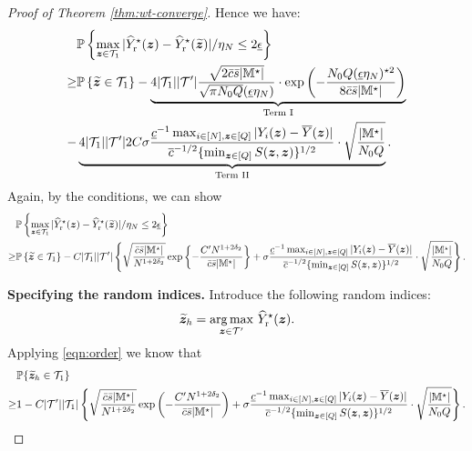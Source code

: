 \documentclass[12pt]{article}
\begin{document}
\begin{proof}[Proof of Theorem \ref{thm:wt-converge}]
Hence we  have:
\begin{align*}
    &{\mathbb{P}}\left\{\max_{{\boldsymbol{z}}\in{\mathcal{T}}_{1}}|{\widehat{Y}}^\star_{\operatorname{r}}({\boldsymbol{z}}) - {\widehat{Y}}^\star_{\operatorname{r}}(\widetilde{{\boldsymbol{z}}})|/\eta_N \le 2\underline{\epsilon}\right\} \\
    \ge & {\mathbb{P}}\left\{\widetilde{{\boldsymbol{z}}}\in {\mathcal{T}}_{1}\right\} -   \underbrace{4|{\mathcal{T}}_{1}| |{\mathcal{T}}'|  \frac{\sqrt{2\bar{c}\bar{s}|{\mathbb{M}}^\star|}}{\sqrt{\pi N_0Q }({\underline{\epsilon}\eta_N})}\cdot \exp\left(-\frac{ N_0Q ({\underline{\epsilon}\eta_N})^{\star 2}}{8\bar{c}\bar{s}|{\mathbb{M}}^\star|}\right)}_{\text{Term I}}\notag\\
    - &  \underbrace{4|{\mathcal{T}}_{1}| |{\mathcal{T}}'| 2C\sigma   \frac{ \underline{c}^{-1} \max_{i\in[N],{\boldsymbol{z}}\in[Q]}|Y_i({\boldsymbol{z}})-\overline{Y}({\boldsymbol{z}})|}{ {\overline{c}^{-1/2} \{\min_{{\boldsymbol{z}}\in[Q]} S({\boldsymbol{z}},{\boldsymbol{z}})}\}^{1/2}}\cdot \sqrt{\frac{|{\mathbb{M}}^\star|}{N_0Q}}}_{\text{Term II}}.
\end{align*}
Again, by the conditions, we can show
\begin{align*}
    &{\mathbb{P}}\left\{\max_{{\boldsymbol{z}}\in{\mathcal{T}}_{1}}|{\widehat{Y}}^\star_{\operatorname{r}}({\boldsymbol{z}}) - {\widehat{Y}}^\star_{\operatorname{r}}(\widetilde{{\boldsymbol{z}}})|/\eta_N \le 2\underline{\epsilon}\right\} \\
    \ge & {\mathbb{P}}\left\{\widetilde{{\boldsymbol{z}}}\in {\mathcal{T}}_{1}\right\} 
    - C|{\mathcal{T}}_{1}| |{\mathcal{T}}'| \left\{\sqrt{\frac{\bar{c}\bar{s}|{\mathbb{M}}^\star|}{N^{1+2\delta_2}}}\exp\left\{-\frac{C'N^{1+2\delta_2}}{\bar{c}\bar{s}|{\mathbb{M}}^\star|}\right\} + \sigma   \frac{ \underline{c}^{-1} \max_{i\in[N],{\boldsymbol{z}}\in[Q]}|Y_i({\boldsymbol{z}})-\overline{Y}({\boldsymbol{z}})|}{ {\overline{c}^{-1/2} \{\min_{{\boldsymbol{z}}\in[Q]} S({\boldsymbol{z}},{\boldsymbol{z}})}\}^{1/2}}\cdot \sqrt{\frac{|{\mathbb{M}}^\star|}{N_0Q}}\right\}.
\end{align*}

\textbf{Specifying the random indices.}
    Introduce the following random indices:
    \begin{align*}
        \widetilde{{\boldsymbol{z}}}_h = \underset{{\boldsymbol{z}}\in{\mathcal{T}}'}{\arg\max}~{\widehat{Y}}^\star_{\operatorname{r}}({\boldsymbol{z}}).
    \end{align*}
    Applying \eqref{eqn:order} we know that
    \begin{align*}
        &{\mathbb{P}}\{\widetilde{{\boldsymbol{z}}}_h\in{\mathcal{T}}_{1}\} \\
        \ge& 1 - C|{\mathcal{T}}'||{\mathcal{T}}_{1}|\left\{\sqrt{\frac{\bar{c}\bar{s}|{\mathbb{M}}^\star|}{N^{1+2\delta_2}}}\exp\left(-\frac{C'N^{1+2\delta_2}}{\bar{c}\bar{s}|{\mathbb{M}}^\star|}\right)+\sigma   \frac{ \underline{c}^{-1} \max_{i\in[N],{\boldsymbol{z}}\in[Q]}|Y_i({\boldsymbol{z}})-\overline{Y}({\boldsymbol{z}})|}{ {\overline{c}^{-1/2} \{\min_{{\boldsymbol{z}}\in[Q]} S({\boldsymbol{z}},{\boldsymbol{z}})}\}^{1/2}}\cdot \sqrt{\frac{|{\mathbb{M}}^\star|}{N_0Q}}\right\}.
    \end{align*}


\end{proof}
\end{document}
